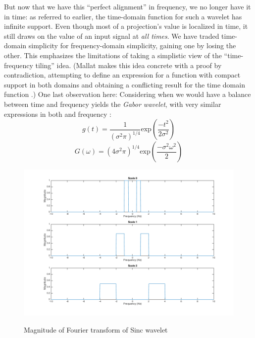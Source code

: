 \documentclass[letterpaper]{article}
\begin{document}
But now that we have this ``perfect alignment'' in frequency, we no longer have it in time:
as referred to earlier, the time-domain function for such a wavelet has infinite support.
Even though most of a projection's value is localized in time,
it still draws on the value of an input signal at \emph{all times}.
We have traded time-domain simplicity for frequency-domain simplicity,
gaining one by losing the other.
This emphasizes the limitations of taking a simplistic view of the ``time-frequency tiling'' idea.
(Mallat makes this idea concrete with a proof by contradiction, 
attempting to define an expression for a function with compact support in both domains
and obtaining a conflicting result for the time domain function
\cite[Theorem~2.6]{mallat}.)
One last observation here:
Considering when we would have a balance between time and frequency yields the \emph{Gabor wavelet},
with very similar expressions in both and frequency \cite[Eq.~4.62]{mallat}:
\[
g(t) = \frac{1}{(\sigma^2 \pi)^{1/4}} \mathrm{exp}\left(\frac{-t^2}{2 \sigma^2}\right)
\]
\[
G(\omega) = (4 \sigma^2 \pi)^{1/4} \mathrm{exp}\left(\frac{-\sigma^2\omega^2}{2}\right)
\]

\begin{figure}[h]
  \caption{Magnitude of Fourier transform of Sinc wavelet}
  \centering
    \includegraphics[width=1\textwidth]{figures/sinctrans3}
  \label{fig:sinctrans3}
\end{figure}

\end{document}
